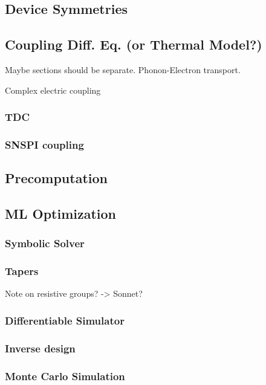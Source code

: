 \documentclass{article}
\begin{document}
\subsection{Device Symmetries}

\subsection{Coupling Diff. Eq. (or Thermal Model?)}

Maybe sections should be separate. Phonon-Electron transport.

Complex electric coupling

\subsubsection{TDC}

\subsubsection{SNSPI coupling}

\subsection{Precomputation}

\subsection{ML Optimization}

\subsubsection{Symbolic Solver}

\subsubsection{Tapers}

Note on resistive groups? -> Sonnet?

\subsubsection{Differentiable Simulator}

\subsubsection{Inverse design}

\subsubsection{Monte Carlo Simulation}
\end{document}
